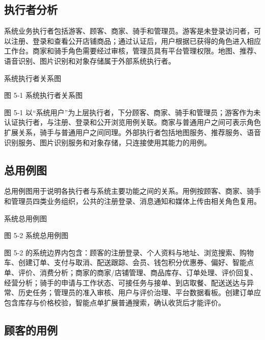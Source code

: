 \subsection{执行者分析}

系统业务执行者包括游客、顾客、商家、骑手和管理员。游客是未登录访问者，可以注册、登录和查看公开店铺商品；通过认证后，用户根据已获得的角色进入相应工作台。商家和骑手角色需要经过审核，管理员具有平台管理权限。地图、推荐、语音识别、图片识别和对象存储属于外部系统执行者。

系统执行者关系图

\begin{center}
\end{center}

图 5-1  系统执行者关系图

图 5-1 以“系统用户”为上层执行者，下分顾客、商家、骑手和管理员；游客作为未认证执行者，与注册、登录和公开浏览用例关联。商家与普通用户之间可表示角色扩展关系，骑手与普通用户之间同理。外部执行者包括地图服务、推荐服务、语音识别服务、图片识别服务和对象存储，只连接使用其能力的用例。

\subsection{总用例图}

总用例图用于说明各执行者与系统主要功能之间的关系。用例按顾客、商家、骑手和管理员四类业务组织，公共的注册登录、消息通知和媒体上传由相关角色复用。

系统总用例图

\begin{center}
\end{center}

图 5-2  系统总用例图

图 5-2 的系统边界内包含：顾客的注册登录、个人资料与地址、浏览搜索、购物车、创建订单、支付与取消、配送跟踪、会员、钱包积分优惠券、偏好、智能点单、评价、消费分析；商家的商家/店铺管理、商品库存、订单处理、评价回复、经营分析；骑手的申请与工作状态、可接任务与接单、到店取餐、配送送达与异常、历史任务；管理员的准入审核、用户与评价治理、平台数据看板。创建订单应包含库存与价格校验，智能点单扩展普通搜索，确认收货后才能评价。

\subsection{顾客的用例}

